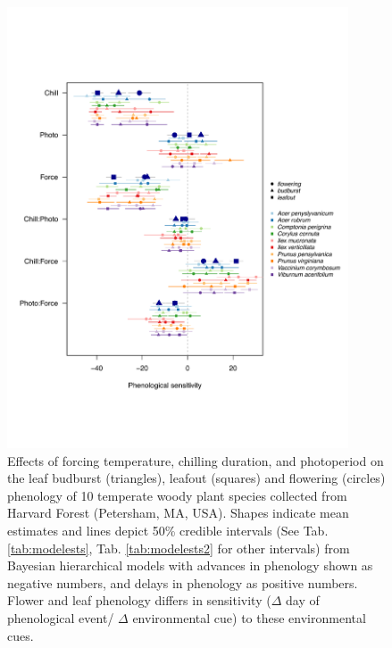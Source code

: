 \documentclass[12pt]{article}\usepackage[]{graphicx}\usepackage[]{color}
\begin{document}
\begin{figure}[h!]
    \centering
         \includegraphics[width=0.9\textwidth]{..//Plots/Flobuds_manuscript_figs/all3phases.pdf}
         \caption{Effects of forcing temperature, chilling duration, and photoperiod on the leaf budburst (triangles), leafout (squares) and flowering (circles) phenology of 10 temperate woody plant species collected from Harvard Forest (Petersham, MA, USA). Shapes indicate mean estimates and lines depict 50\% credible intervals (See Tab. \ref{tab:modelests}, Tab. \ref{tab:modelests2} for other intervals) from Bayesian hierarchical models with advances in phenology shown as negative numbers, and delays in phenology as positive numbers. Flower and leaf phenology differs in sensitivity ($\Delta$ day of phenological event/ $\Delta$ environmental cue) to these environmental cues.}
    \label{fig:model}
\end{figure}
\end{document}
